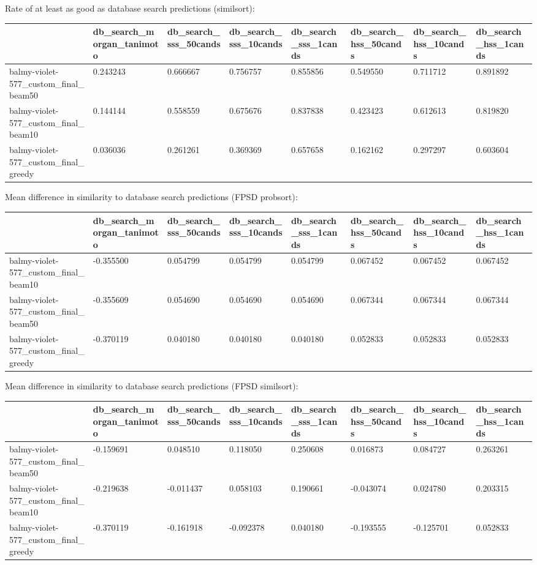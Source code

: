 Rate of at least as good as database search predictions (similsort):
\begin{tabular}{llllllll}
\toprule
 & db_search_morgan_tanimoto & db_search_sss_50cands & db_search_sss_10cands & db_search_sss_1cands & db_search_hss_50cands & db_search_hss_10cands & db_search_hss_1cands \\
\midrule
balmy-violet-577_custom_final_beam50 & 0.243243 & 0.666667 & 0.756757 & 0.855856 & 0.549550 & 0.711712 & 0.891892 \\
balmy-violet-577_custom_final_beam10 & 0.144144 & 0.558559 & 0.675676 & 0.837838 & 0.423423 & 0.612613 & 0.819820 \\
balmy-violet-577_custom_final_greedy & 0.036036 & 0.261261 & 0.369369 & 0.657658 & 0.162162 & 0.297297 & 0.603604 \\
\bottomrule
\end{tabular}



Mean difference in similarity to database search predictions (FPSD probsort):
\begin{tabular}{llllllll}
\toprule
 & db_search_morgan_tanimoto & db_search_sss_50cands & db_search_sss_10cands & db_search_sss_1cands & db_search_hss_50cands & db_search_hss_10cands & db_search_hss_1cands \\
\midrule
balmy-violet-577_custom_final_beam10 & -0.355500 & 0.054799 & 0.054799 & 0.054799 & 0.067452 & 0.067452 & 0.067452 \\
balmy-violet-577_custom_final_beam50 & -0.355609 & 0.054690 & 0.054690 & 0.054690 & 0.067344 & 0.067344 & 0.067344 \\
balmy-violet-577_custom_final_greedy & -0.370119 & 0.040180 & 0.040180 & 0.040180 & 0.052833 & 0.052833 & 0.052833 \\
\bottomrule
\end{tabular}



Mean difference in similarity to database search predictions (FPSD similsort):
\begin{tabular}{llllllll}
\toprule
 & db_search_morgan_tanimoto & db_search_sss_50cands & db_search_sss_10cands & db_search_sss_1cands & db_search_hss_50cands & db_search_hss_10cands & db_search_hss_1cands \\
\midrule
balmy-violet-577_custom_final_beam50 & -0.159691 & 0.048510 & 0.118050 & 0.250608 & 0.016873 & 0.084727 & 0.263261 \\
balmy-violet-577_custom_final_beam10 & -0.219638 & -0.011437 & 0.058103 & 0.190661 & -0.043074 & 0.024780 & 0.203315 \\
balmy-violet-577_custom_final_greedy & -0.370119 & -0.161918 & -0.092378 & 0.040180 & -0.193555 & -0.125701 & 0.052833 \\
\bottomrule
\end{tabular}



